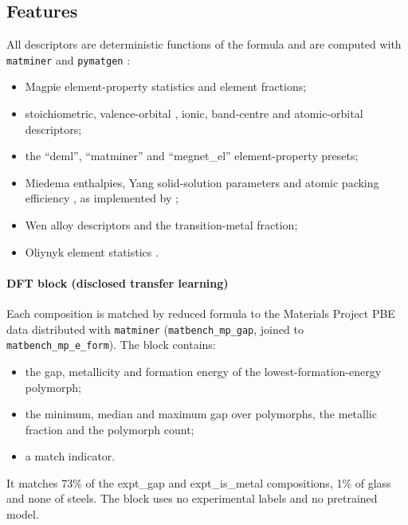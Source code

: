 \subsection{Features}
All descriptors are deterministic functions of the formula and are computed with \texttt{matminer} \citep{ward2018matminer} and \texttt{pymatgen} \citep{ong2013pymatgen}:
\begin{itemize}
\item Magpie element-property statistics \citep{ward2016magpie} and element fractions;
\item stoichiometric, valence-orbital \citep{meredig2014}, ionic, band-centre and atomic-orbital descriptors;
\item the ``deml'', ``matminer'' and ``megnet\_el'' element-property presets;
\item Miedema enthalpies, Yang solid-solution parameters \citep{yang2012ss} and atomic packing efficiency \citep{laws2015ape}, as implemented by \citet{ward2018bmg};
\item Wen alloy descriptors and the transition-metal fraction;
\item Oliynyk element statistics \citep{oliynyk2016}.
\end{itemize}

\paragraph{DFT block (disclosed transfer learning)}
Each composition is matched by reduced formula to the Materials Project PBE data distributed with \texttt{matminer} (\texttt{matbench\_mp\_gap}, joined to \texttt{matbench\_mp\_e\_form}). The block contains:
\begin{itemize}
\item the gap, metallicity and formation energy of the lowest-formation-energy polymorph;
\item the minimum, median and maximum gap over polymorphs, the metallic fraction and the polymorph count;
\item a match indicator.
\end{itemize}
It matches 73\% of the expt\_gap and expt\_is\_metal compositions, 1\% of glass and none of steels.
The block uses no experimental labels and no pretrained model.


